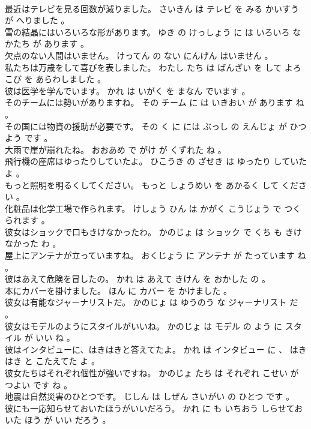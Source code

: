 \documentclass[8pt]{extreport}
\begin{document}
\begin{CJK}{UTF8}{min}
\\	最近はテレビを見る回数が減りました。	さいきん は テレビ を みる かいすう が へりました 。 
\\	雪の結晶にはいろいろな形があります。	ゆき の けっしょう に は いろいろ な かたち が あります 。 
\\	欠点のない人間はいません。	けってん の ない にんげん はいません 。 
\\	私たちは万歳をして喜びを表しました。	わたし たち は ばんざい を して よろこび を あらわしました 。 
\\	彼は医学を学んでいます。	かれ は いがく を まなん でいます 。 
\\	そのチームには勢いがありますね。	その チーム に は いきおい が あります ね 。 
\\	その国には物資の援助が必要です。	その く に には ぶっし の えんじょ が ひつよう です 。 
\\	大雨で崖が崩れたね。	おおあめ で がけ が くずれた ね 。 
\\	飛行機の座席はゆったりしていたよ。	ひこうき の ざせき は ゆったり していた よ 。 
\\	もっと照明を明るくしてください。	もっと しょうめい を あかるく して ください 。 
\\	化粧品は化学工場で作られます。	けしょう ひん は かがく こうじょう で つくられます 。 
\\	彼女はショックで口もきけなかったわ。	かのじょ は ショック で くち も きけなかった わ 。 
\\	屋上にアンテナが立っていますね。	おくじょう に アンテナ が たっています ね 。 
\\	彼はあえて危険を冒したの。	かれ は あえて きけん を おかした の 。 
\\	本にカバーを掛けました。	ほん に カバー を かけました 。 
\\	彼女は有能なジャーナリストだ。	かのじょ は ゆうのう な ジャーナリスト だ 。 
\\	彼女はモデルのようにスタイルがいいね。	かのじょ は モデル の よう に スタイル が いい ね 。 
\\	彼はインタビューに、はきはきと答えてたよ。	かれ は インタビュー に 、 はきはき と こたえてた よ 。 
\\	彼女たちはそれぞれ個性が強いですね。	かのじょ たち は それぞれ こせい が つよい です ね 。 
\\	地震は自然災害のひとつです。	じしん は しぜん さいがい の ひとつ です 。 
\\	彼にも一応知らせておいたほうがいいだろう。	かれ に も いちおう しらせておいた ほう が いい だろう 。 

\end{CJK}
\end{document}
